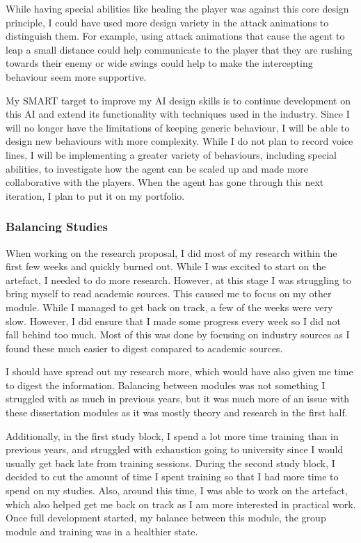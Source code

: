 \documentclass{IEEEtran}
\begin{document}
While having special abilities like healing the player was against this core design principle, I could have used more design variety in the attack animations to distinguish them. For example, using attack animations that cause the agent to leap a small distance could help communicate to the player that they are rushing towards their enemy or wide swings could help to make the intercepting behaviour seem more supportive.

My SMART target to improve my AI design skills is to continue development on this AI and extend its functionality with techniques used in the industry. Since I will no longer have the limitations of keeping generic behaviour, I will be able to design new behaviours with more complexity. While I do not plan to record voice lines, I will be implementing a greater variety of behaviours, including special abilities, to investigate how the agent can be scaled up and made more collaborative with the players. When the agent has gone through this next iteration, I plan to put it on my portfolio.

\subsubsection{Balancing Studies}

When working on the research proposal, I did most of my research within the first few weeks and quickly burned out. While I was excited to start on the artefact, I needed to do more research. However, at this stage I was struggling to bring myself to read academic sources. This caused me to focus on my other module. While I managed to get back on track, a few of the weeks were very slow. However, I did ensure that I made some progress every week so I did not fall behind too much. Most of this was done by focusing on industry sources as I found these much easier to digest compared to academic sources.

I should have spread out my research more, which would have also given me time to digest the information. Balancing between modules was not something I struggled with as much in previous years, but it was much more of an issue with these dissertation modules as it was mostly theory and research in the first half.

Additionally, in the first study block, I spend a lot more time training than in previous years, and struggled with exhaustion going to university since I would usually get back late from training sessions. During the second study block, I decided to cut the amount of time I spent training so that I had more time to spend on my studies. Also, around this time, I was able to work on the artefact, which also helped get me back on track as I am more interested in practical work. Once full development started, my balance between this module, the group module and training was in a healthier state.
\end{document}
